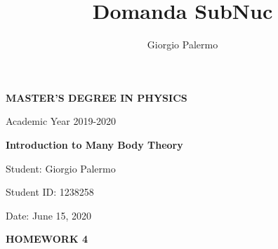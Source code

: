 \documentclass[a4paper]{article}
\title{Domanda SubNuc}
\author{Giorgio Palermo}
\begin{document}
\hypersetup{linkcolor = black}
\hypersetup{linkcolor = blue}

\begin{center}
    \textbf{MASTER'S DEGREE IN PHYSICS}
    
    Academic Year 2019-2020
    
    \medskip
    \textbf{Introduction to Many Body Theory}
\end{center}

\vspace{0.8cm}
Student: Giorgio Palermo

Student ID: 1238258

Date: June 15, 2020

\bigskip

\begin{center}
\textbf{HOMEWORK 4}
\end{center}
\end{document}
